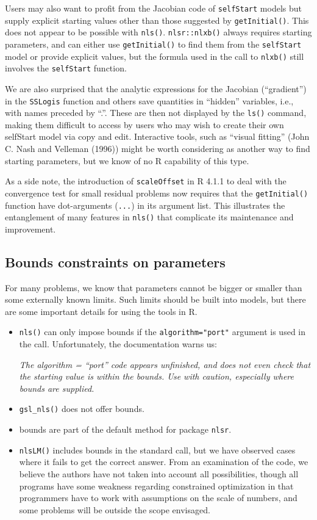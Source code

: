 Users may also want to profit from the Jacobian code of \texttt{selfStart} models
but supply explicit starting values other than those suggested by \texttt{getInitial()}.
This does not appear to be possible with \texttt{nls()}. \texttt{nlsr::nlxb()} always requires
starting parameters, and can either use \texttt{getInitial()} to find them from the \texttt{selfStart}
model or provide explicit values, but the formula used in the call to \texttt{nlxb()}
still involves the \texttt{selfStart} function.

We are also surprised that the
analytic expressions for the Jacobian (``gradient'') in the \texttt{SSLogis} function
and others save quantities in ``hidden''
variables, i.e., with names preceded by ``.''.
These are then not displayed by the \texttt{ls()}
command, making them difficult to access by users who may wish to create
their own selfStart model via copy and edit.
Interactive tools, such as ``visual fitting'' (John C. Nash and Velleman (1996)) might be
worth considering as another way to find starting parameters, but we know of no
R capability of this type.

As a side note, the introduction of \texttt{scaleOffset} in R 4.1.1 to deal with the
convergence test for small residual problems now requires that the \texttt{getInitial()}
function have dot-arguments (\texttt{...}) in its argument list. This illustrates the
entanglement of many features in \texttt{nls()} that complicate its maintenance and
improvement.

\subsection{Bounds constraints on parameters}\label{bounds-constraints-on-parameters}

For many problems, we know that parameters cannot be bigger or smaller than some
externally known limits. Such limits should be built into models, but there
are some important details for using the tools in R.

\begin{itemize}
\item
  \texttt{nls()} can only impose bounds if the \texttt{algorithm="port"} argument is
  used in the call. Unfortunately, the documentation warns us:

  \emph{The algorithm = ``port'' code appears unfinished, and does not even
  check that the starting value is within the bounds. Use with
  caution, especially where bounds are supplied.}
\item
  \texttt{gsl\_nls()} does not offer bounds.
\item
  bounds are part of the default method for package \texttt{nlsr}.
\item
  \texttt{nlsLM()} includes bounds in the standard call, but we have observed cases
  where it fails to get the correct answer. From an examination of the code,
  we believe the authors have not taken into account all possibilities, though
  all programs have some weakness regarding constrained optimization in that
  programmers have to work with assumptions on the scale of numbers,
  and some problems will be outside the scope envisaged.
\end{itemize}

